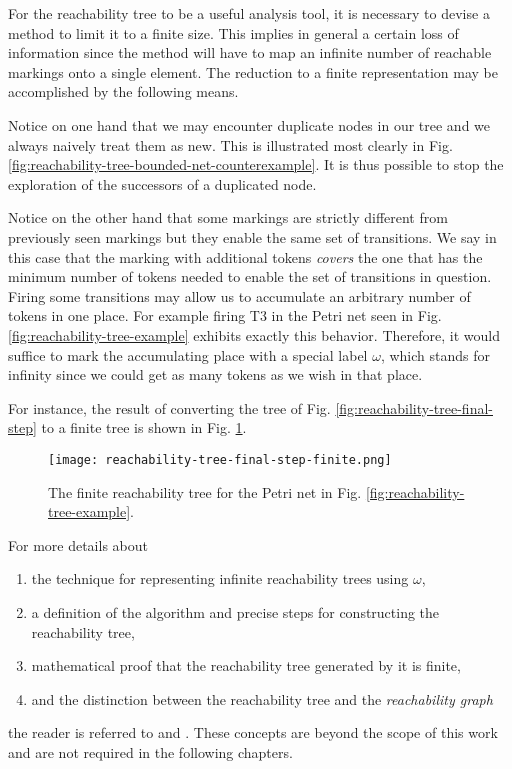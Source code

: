 For the reachability tree to be a useful analysis tool,
it is necessary to devise a method to limit it to a finite size.
This implies in general a certain loss of information since the method will have to map
an infinite number of reachable markings onto a single element.
The reduction to a finite representation may be accomplished by the following means.

Notice on one hand that we may encounter duplicate nodes in our tree and we always naively treat them as new.
This is illustrated most clearly in Fig. \ref{fig:reachability-tree-bounded-net-counterexample}.
It is thus possible to stop the exploration of the successors of a duplicated node.

Notice on the other hand that some markings are strictly different from previously seen markings
but they enable the same set of transitions.
We say in this case that the marking with additional tokens \emph{covers} the one
that has the minimum number of tokens needed to enable the set of transitions in question.
Firing some transitions may allow us to accumulate an arbitrary number of tokens in one place.
For example firing T3 in the Petri net seen in Fig. \ref{fig:reachability-tree-example} exhibits exactly this behavior.
Therefore, it would suffice to mark the accumulating place with a special label $\omega$, which stands for infinity
since we could get as many tokens as we wish in that place.

For instance, the result of converting the tree of Fig. \ref{fig:reachability-tree-final-step}
to a finite tree is shown in Fig. \ref{fig:reachability-tree-final-step-finite}.

\begin{figure}[!htb]
    \centering
    \texttt{[image: reachability-tree-final-step-finite.png]}
    \caption{The finite reachability tree for the Petri net in Fig. \ref{fig:reachability-tree-example}.}
    \label{fig:reachability-tree-final-step-finite}
\end{figure}

For more details about

\begin{enumerate}
    \item the technique for representing infinite reachability trees using $\omega$,
    \item a definition of the algorithm and precise steps for constructing the reachability tree,
    \item mathematical proof that the reachability tree generated by it is finite,
    \item and the distinction between the reachability tree and the \emph{reachability graph}
\end{enumerate}

the reader is referred to \cite{murata1989} and \cite{peterson1981}.
These concepts are beyond the scope of this work and are not required in the following chapters.
